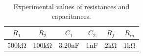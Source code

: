 {\renewcommand{\arraystretch}{1.5}
\begin{table}
    \centering
    \caption{Experimental values of resistances and capacitances.}
    \begin{tabular}{*6c}
        \toprule
        $R_1$ & $R_2$ & $C_1$ & $C_2$ & $R_f$ & $R_{in}$ \\    
        \hline
        \midrule
        $500$\unit{\kilo\ohm} & $100$\unit{\kilo\ohm} & $3.20$\unit{\nano\farad}
          & $1$\unit{\nano\farad} & $2$\unit{\kilo\ohm} &
        $1$\unit{\kilo\ohm} \\
        \bottomrule
    \end{tabular}
    \label{tab:expvalues}
    \vspace{-1em}
\end{table}
}
